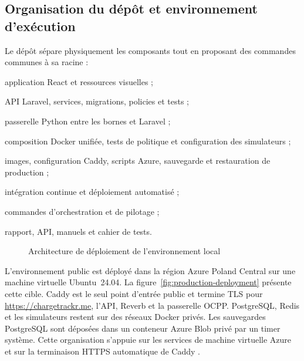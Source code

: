 \subsection{Organisation du dépôt et environnement d'exécution}

Le dépôt sépare physiquement les composants tout en proposant des commandes
communes à sa racine :

\begin{description}[leftmargin=37mm,style=nextline]
  \item[\texttt{frontend/}] application React et ressources visuelles ;
  \item[\texttt{backend/}] API Laravel, services, migrations, policies et tests ;
  \item[\texttt{ocpp-gateway/}] passerelle Python entre les bornes et Laravel ;
  \item[\texttt{infra/}] composition Docker unifiée, tests de politique et
  configuration des simulateurs ;
  \item[\texttt{deployment/}] images, configuration Caddy, scripts Azure,
  sauvegarde et restauration de production ;
  \item[\texttt{.github/workflows/}] intégration continue et déploiement
  automatisé ;
  \item[\texttt{scripts/}] commandes d'orchestration et de pilotage ;
  \item[\texttt{docs/}] rapport, API, manuels et cahier de tests.
\end{description}

\begin{figure}[H]
  \centering
  \resizebox{0.94\textwidth}{!}{}
  \caption{Architecture de déploiement de l'environnement local}
  \label{fig:deployment-architecture}
\end{figure}

L'environnement public est déployé dans la région Azure Poland Central sur une
machine virtuelle Ubuntu~24.04. La figure~\ref{fig:production-deployment}
présente cette cible. Caddy est le seul point d'entrée public et termine TLS pour
\url{https://chargetrackr.me}, l'API, Reverb et la passerelle OCPP. PostgreSQL,
Redis et les simulateurs restent sur des réseaux Docker privés. Les sauvegardes
PostgreSQL sont déposées dans un conteneur Azure Blob privé par un timer système.
Cette organisation s'appuie sur les services de machine virtuelle Azure et sur
la terminaison HTTPS automatique de Caddy \cite{azureLinuxVm,caddy}.

